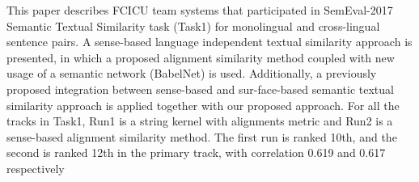 This paper describes FCICU team systems that participated in SemEval-2017 Semantic Textual Similarity task (Task1) for monolingual and cross-lingual sentence pairs. A sense-based language independent textual similarity approach is presented, in which a proposed alignment similarity method coupled with new usage of a semantic network (BabelNet) is used. Additionally, a previously proposed integration between sense-based and sur-face-based semantic textual similarity approach is applied together with our proposed approach. For all the tracks in Task1, Run1 is a string kernel with alignments metric and Run2 is a sense-based alignment similarity method. The first run is ranked 10th, and the second is ranked 12th in the primary track, with correlation 0.619 and 0.617 respectively
